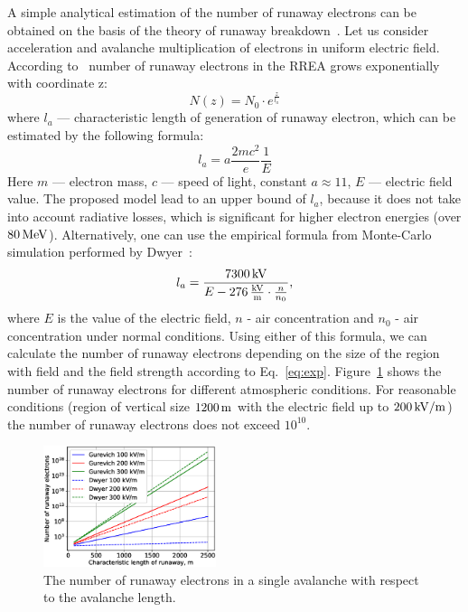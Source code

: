\documentclass[doublecol,linenumbers]{epl2} %
\begin{document}
    A simple analytical estimation of the number of runaway electrons can be obtained on the basis of the theory of runaway breakdown~\cite{Gurevich:2001}. Let us consider acceleration and avalanche multiplication of electrons in uniform electric field. According to~\cite{Gurevich:2001} number of runaway electrons in the RREA grows exponentially with coordinate z:
    \begin{equation}
    \label{eq:exp}
    N(z) = N_0 \cdot e^{\frac{z}{l_a}}
    \end{equation}
    where $l_a$ --- characteristic length of generation of runaway electron, which can be estimated by the following formula:
    \begin{equation}
    l_a = a\frac{2 m c^{2}}{e} \frac{1}{E}
    \end{equation}
    Here $m$ --- electron mass, $c$ --- speed of light, constant $a \approx 11$, $E$ --- electric field value. The proposed model lead to an upper bound of $l_a$, because it does not take into account radiative losses, which is significant for higher electron energies (over $80~\un{MeV}$).
    Alternatively, one can use the empirical formula from Monte-Carlo simulation performed by Dwyer~\cite{Dwyer2007}:
    \begin{equation}
    \label{eq:dwyer}
    l_a = \frac{7300\un{kV}}{E - 276\un{ \frac{kV}{m}} \cdot \frac{n}{n_0}},
    \end{equation}
    where $E$ is the value of the electric field, $n$ - air concentration and $n_0$ - air concentration under normal conditions. Using either of this formula, we can calculate the number of runaway electrons depending on the size of the region with field and the field strength according to Eq.~\ref{eq:exp}. 
    Figure~\ref{fig:gur} shows the number of runaway electrons for different atmospheric conditions. For reasonable conditions  (region of vertical size $1200\un{m}$ with the electric field up to $200\un{kV/m}$) the number of runaway electrons does not exceed $10^{10}$.
    \begin{figure}[h]
        \centering
        \includegraphics[width=0.45\textwidth]{figures/gurevich.eps}
        \caption{The number of runaway electrons in a single avalanche with respect to the avalanche length.}
        \label{fig:gur}
    \end{figure}
    
\end{document}
